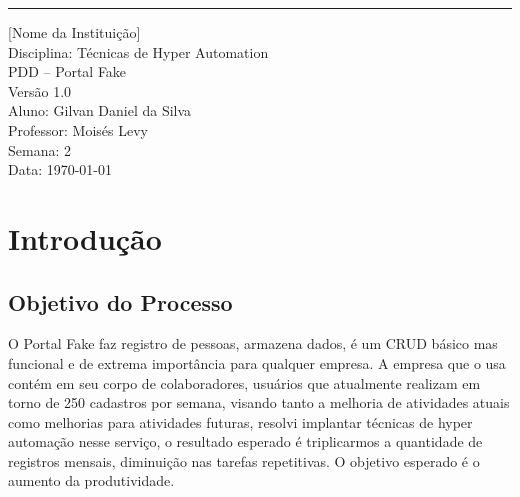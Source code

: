 \documentclass[12pt]{scrreprt}
\def\myversion{1.0 }
\begin{document}
\begin{titlepage}
\begin{flushright}
    \rule{16cm}{5pt}\vskip1cm
    \begin{bfseries}
        \Large{[Nome da Instituição]}\\
        \vspace{0.5cm}
        \Large{Disciplina: Técnicas de Hyper Automation}\\
        \vspace{1.5cm}
        \Huge{PDD -- Portal Fake}\\
        \vspace{1.5cm}
        \LARGE{Versão \myversion}\\
        \vspace{1.5cm}
        Aluno: Gilvan Daniel da Silva\\
        \vspace{0.5cm}
        Professor: Moisés Levy\\
        \vspace{0.5cm}
        Semana: 2\\
        \vspace{1.5cm}
        Data: \today\\
    \end{bfseries}
\end{flushright}
\end{titlepage}

\tableofcontents
\clearpage

\chapter{Introdução}

\section{Objetivo do Processo}
O Portal Fake faz registro de pessoas, armazena dados, é um CRUD básico mas funcional e de extrema importância para qualquer empresa. A empresa que o usa contém em seu corpo de colaboradores, usuários que atualmente realizam em torno de 250 cadastros por semana, visando tanto a melhoria de atividades atuais como melhorias para atividades futuras, resolvi implantar técnicas de hyper automação nesse serviço, o resultado esperado é triplicarmos a quantidade de registros mensais, diminuição nas tarefas repetitivas. O objetivo esperado é o aumento da produtividade.
\end{document}
